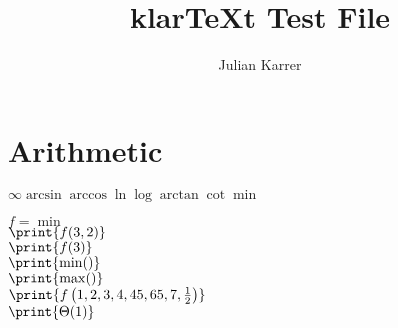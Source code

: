 \documentclass[oneside, a4paper]{article}
\author{Julian Karrer}
\title{klarTeXt Test File}
\begin{document}
\maketitle
\section*{Arithmetic}
$\infty \arcsin \arccos \ln \log \arctan \cot \min $\\
\begin{program}

$f = \min$\\
$\print{f (3,2)}$\\
$\print{f (3)}$\\
$\print{\min ()}$\\
$\print{\max ()}$\\
$\print{f\left(1,2,3,4,45,65,7,\frac{1}{2}\right)}$\\
$\print{\Theta(1)}$\\


\end{program}
\end{document}
